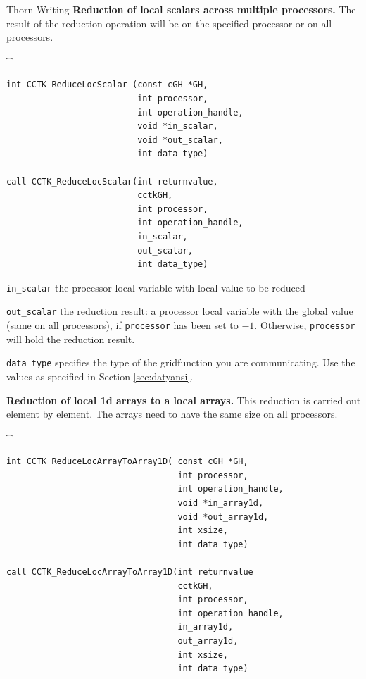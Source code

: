\begin{cactuspart}{Thorn Writing}
{\bf Reduction of local scalars across multiple processors.} The result of 
the reduction operation will be on the specified processor or on all processors.

{\t
\begin{verbatim}
int CCTK_ReduceLocScalar (const cGH *GH, 
                          int processor, 
                          int operation_handle,
                          void *in_scalar, 
                          void *out_scalar, 
                          int data_type)

call CCTK_ReduceLocScalar(int returnvalue,
                          cctkGH,
                          int processor,
                          int operation_handle,
                          in_scalar,
                          out_scalar,
                          int data_type)
\end{verbatim}
}
\begin{Lentry}
\item[\texttt{in\_scalar}] the processor local variable with local value to be reduced
\item[\texttt{out\_scalar}] the reduction result: a processor local variable 
with the global value (same on all processors), if \texttt{processor} has been
set to $-1$. Otherwise, \texttt{processor} will hold the reduction result.
\item[\texttt{data\_type}]
specifies the type of the gridfunction 
you are communicating. Use the values as specified in Section
\ref{sec:datyansi}.
\end{Lentry}

\vskip 0.25cm

{\bf Reduction of local 1d arrays to a local arrays.} This reduction is carried
out element by element. The arrays need to have the same size on all
processors.
{\t
\begin{verbatim}
int CCTK_ReduceLocArrayToArray1D( const cGH *GH, 
                                  int processor,
                                  int operation_handle,
                                  void *in_array1d, 
                                  void *out_array1d, 
                                  int xsize,
                                  int data_type)

call CCTK_ReduceLocArrayToArray1D(int returnvalue
                                  cctkGH,
                                  int processor,
                                  int operation_handle,
                                  in_array1d,
                                  out_array1d,
                                  int xsize,
                                  int data_type)
\end{verbatim}
}


\end{cactuspart}
